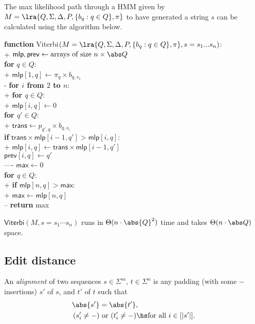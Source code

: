 \documentclass{article}
\begin{document}
\begin{theorem}[L19]
	The max likelihood path through a HMM given by $M=\lra{Q,\Sigma,\Delta,
	P,\{b_q:q\in Q\},\pi}$ to have generated a string $s$ can be calculated 
	using the algorithm below.
	\begin{pseudo}
		\textbf{function} \textsf{Viterbi}$(M=\lra{Q,\Sigma,\Delta, P,
			\{b_q:q\in Q\},\pi}, s=s_1...s_n)$:									\\+
			$\textsf{mlp}, \textsf{prev}
				\leftarrow \text{arrays of size $n\times\abs Q$}$				\\
			\textbf{for} $q\in Q$:												\\+
				$\textsf{mlp}[1,q]\leftarrow\pi_q\times b_{q,s_1}$				\\-
			\textbf{for $i$ from $2$ to $n$}:									\\+
				\textbf{for $q\in Q$}:											\\+
					$\textsf{mlp}[i,q]\leftarrow 0$								\\
					\textbf{for $q'\in Q$}:										\\+
						$\textsf{trans}\leftarrow p_{q',q}\times b_{q,s_i}$	\\
						\textbf{if} $\textsf{trans}\times\textsf{mlp}[i-1,q']>
							\textsf{mlp}[i,q]$:									\\+
							$\textsf{mlp}[i,q]\leftarrow
								\textsf{trans}\times\textsf{mlp}[i-1,q']$		\\
							$\textsf{prev}[i,q]\leftarrow q'$					\\----
			$\textsf{max}\leftarrow 0$											\\
			\textbf{for $q\in Q$}:												\\+
				\textbf{if} $\textsf{mlp}[n,q]>\textsf{max}$:					\\+
					$\textsf{max}\leftarrow\textsf{mlp}[n,q]$					\\--
			\textbf{return} \textsf{max}
	\end{pseudo}
	$\textsf{Viterbi}(M, s=s_1\cdots s_n)$ runs in $\Theta(n\cdot\abs{Q}^2)$ time
	and takes $\Theta(n\cdot\abs Q)$ space.
\end{theorem}

\subsection{Edit distance}

\begin{definition}
	An \emph{alignment} of two sequences $s\in\Sigma^m$, $t\in\Sigma^n$ is
	any padding (with some $-$ insertions) $s'$ of $s$, and $t'$ of $t$ such that
	\begin{align*}
		\abs{s'}&=\abs{t'},\\
		(s'_i\not=-)&\text{ or }(t'_i\not=-)\hs\text{for all }i\in[|s'|].
	\end{align*}
\end{definition}
\end{document}
